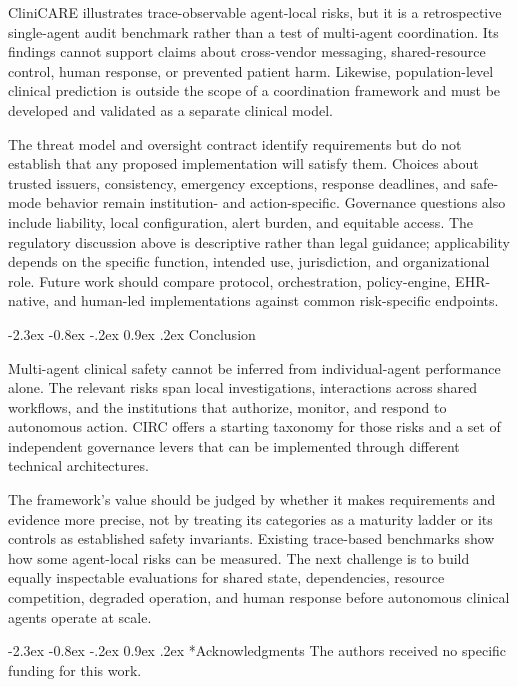 \documentclass[10pt]{article}
\makeatletter
\renewcommand\section{\@startsection{section}{1}{\z@}%
  {-2.3ex \@plus -0.8ex \@minus -.2ex}%
  {0.9ex \@plus .2ex}%
  {\normalfont\sffamily\bfseries\normalsize}}
\makeatother
\begin{document}
CliniCARE illustrates trace-observable agent-local risks, but it is a retrospective single-agent audit
benchmark rather than a test of multi-agent coordination. Its findings cannot support claims about
cross-vendor messaging, shared-resource control, human response, or prevented patient harm. Likewise,
population-level clinical prediction is outside the scope of a coordination framework and must be
developed and validated as a separate clinical model.

The threat model and oversight contract identify requirements but do not establish that any proposed
implementation will satisfy them. Choices about trusted issuers, consistency, emergency exceptions,
response deadlines, and safe-mode behavior remain institution- and action-specific. Governance
questions also include liability, local configuration, alert burden, and equitable access. The
regulatory discussion above is descriptive rather than legal guidance; applicability depends on the
specific function, intended use, jurisdiction, and organizational role. Future work should compare
protocol, orchestration, policy-engine, EHR-native, and human-led implementations against common
risk-specific endpoints.

\section{Conclusion}

Multi-agent clinical safety cannot be inferred from individual-agent performance alone. The relevant
risks span local investigations, interactions across shared workflows, and the institutions that
authorize, monitor, and respond to autonomous action. CIRC offers a starting taxonomy for those risks
and a set of independent governance levers that can be implemented through different technical
architectures.

The framework's value should be judged by whether it makes requirements and evidence more precise,
not by treating its categories as a maturity ladder or its controls as established safety invariants.
Existing trace-based benchmarks show how some agent-local risks can be measured. The next challenge is
to build equally inspectable evaluations for shared state, dependencies, resource competition,
degraded operation, and human response before autonomous clinical agents operate at scale.

\section*{Acknowledgments}
The authors received no specific funding for this work.
\end{document}

